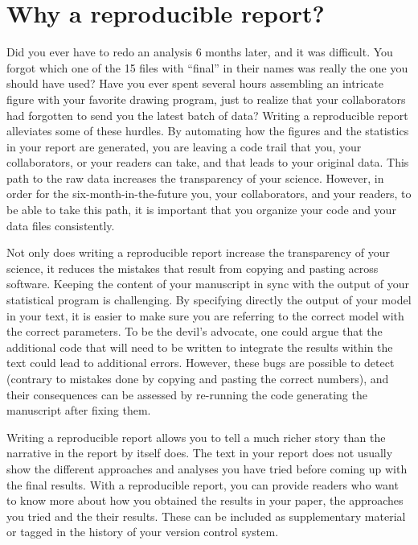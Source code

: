 \documentclass[
]{book}
\theoremstyle{definition}
\theoremstyle{definition}
\theoremstyle{definition}
\theoremstyle{definition}
\theoremstyle{remark}
\begin{document}
\hypertarget{why-a-reproducible-report}{%
\section{Why a reproducible report?}\label{why-a-reproducible-report}}

Did you ever have to redo an analysis 6 months later, and it was difficult. You forgot which one of the 15 files with ``final'' in their names was really the one you should have used? Have you ever spent several hours assembling an intricate figure with your favorite drawing program, just to realize that your collaborators had forgotten to send you the latest batch of data? Writing a reproducible report alleviates some of these hurdles. By automating how the figures and the statistics in your report are generated, you are leaving a code trail that you, your collaborators, or your readers can take, and that leads to your original data. This path to the raw data increases the transparency of your science. However, in order for the six-month-in-the-future you, your collaborators, and your readers, to be able to take this path, it is important that you organize your code and your data files consistently.

Not only does writing a reproducible report increase the transparency of your science, it reduces the mistakes that result from copying and pasting across software. Keeping the content of your manuscript in sync with the output of your statistical program is challenging. By specifying directly the output of your model in your text, it is easier to make sure you are referring to the correct model with the correct parameters. To be the devil's advocate, one could argue that the additional code that will need to be written to integrate the results within the text could lead to additional errors. However, these bugs are possible to detect (contrary to mistakes done by copying and pasting the correct numbers), and their consequences can be assessed by re-running the code generating the manuscript after fixing them.

Writing a reproducible report allows you to tell a much richer story than the narrative in the report by itself does. The text in your report does not usually show the different approaches and analyses you have tried before coming up with the final results. With a reproducible report, you can provide readers who want to know more about how you obtained the results in your paper, the approaches you tried and the their results. These can be included as supplementary material or tagged in the history of your version control system.
\end{document}

